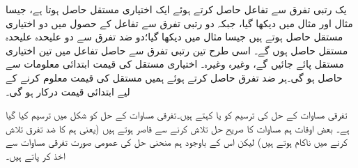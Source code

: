 یک رتبی تفرق سے تفاعل حاصل کرتے ہوئے ایک اختیاری مستقل حاصل ہوتا ہے، جیسا مثال  اور مثال  میں دیکھا گیا،  جبکہ دو رتبی تفرق  سے تفاعل کے حصول میں دو اختیاری مستقل حاصل ہوتے ہیں جیسا مثال  میں دیکھا گیا؛دو ضد تفرق سے دو  علیحدہ علیحدہ مستقل حاصل ہوں گے۔ اسی طرح تین رتبی تفرق سے  حاصل تفاعل میں تین اختیاری مستقل پائے جائیں گے، وغیرہ وغیرہ۔ اختیاری مستقل کی قیمت ابتدائی معلومات سے  حاصل ہو گی۔ہر  ضد تفرق حاصل کرتے ہوئے ہمیں مستقل   کی قیمت معلوم کرنے کے لیے ابتدائی قیمت درکار ہو گی۔

تفرقی مساوات کے حل کی ترسیم کو  یا  کہتے ہیں۔تفرقی مساوات  کے حل  کو شکل  میں  ترسیم کیا  گیا ہے۔ بعض اوقات ہم مساوات  کا صریح حل تلاش کرنے سے قاصر ہوتے ہیں (یعنی ہم  کا ضد تفرق تلاش کرنے میں ناکام ہوتے ہیں) لیکن اس کے باوجود ہم منحنی حل کی عمومی صورت تفرقی مساوات سے اخذ کر پاتے ہیں۔

